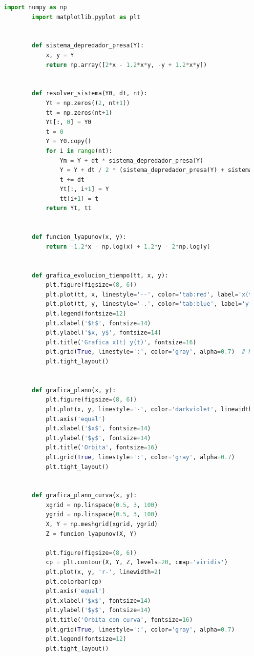 \documentclass{report}
\begin{document}
    \begin{lstlisting}[language=Python]
        import numpy as np
        import matplotlib.pyplot as plt
        
        
        def sistema_depredador_presa(Y):
            x, y = Y
            return np.array([2*x - 1.2*x*y, -y + 1.2*x*y])
        
        
        def resolver_sistema(Y0, dt, nt):
            Yt = np.zeros((2, nt+1))
            tt = np.zeros(nt+1)
            Yt[:, 0] = Y0
            t = 0
            Y = Y0.copy()
            for i in range(nt):
                Ym = Y + dt * sistema_depredador_presa(Y)
                Y = Y + dt / 2 * (sistema_depredador_presa(Y) + sistema_depredador_presa(Ym))
                t += dt
                Yt[:, i+1] = Y
                tt[i+1] = t
            return Yt, tt
        
        
        def funcion_lyapunov(x, y):
            return -1.2*x - np.log(x) + 1.2*y - 2*np.log(y)
        
        
        def grafica_evolucion_tiempo(tt, x, y):
            plt.figure(figsize=(8, 6))
            plt.plot(tt, x, linestyle='--', color='tab:red', label='x(t)', linewidth=2)
            plt.plot(tt, y, linestyle='-.', color='tab:blue', label='y(t)', linewidth=2)
            plt.legend(fontsize=12)
            plt.xlabel('$t$', fontsize=14)
            plt.ylabel('$x, y$', fontsize=14)
            plt.title('Grafica x(t) y(t)', fontsize=16)
            plt.grid(True, linestyle=':', color='gray', alpha=0.7)  # More subtle grid lines
            plt.tight_layout()
        
        
        def grafica_plano(x, y):
            plt.figure(figsize=(8, 6))
            plt.plot(x, y, linestyle='-', color='darkviolet', linewidth=2)
            plt.axis('equal')
            plt.xlabel('$x$', fontsize=14)
            plt.ylabel('$y$', fontsize=14)
            plt.title('Orbita', fontsize=16)
            plt.grid(True, linestyle=':', color='gray', alpha=0.7)
            plt.tight_layout()
        
        
        def grafica_plano_curva(x, y):
            xgrid = np.linspace(0.5, 3, 100)
            ygrid = np.linspace(0.5, 3, 100)
            X, Y = np.meshgrid(xgrid, ygrid)
            Z = funcion_lyapunov(X, Y)
        
            plt.figure(figsize=(8, 6))
            cp = plt.contour(X, Y, Z, levels=20, cmap='viridis')
            plt.plot(x, y, 'r-', linewidth=2)
            plt.colorbar(cp)
            plt.axis('equal')
            plt.xlabel('$x$', fontsize=14)
            plt.ylabel('$y$', fontsize=14)
            plt.title('Orbita con curva', fontsize=16)
            plt.grid(True, linestyle=':', color='gray', alpha=0.7)
            plt.legend(fontsize=12)
            plt.tight_layout()
        

\end{lstlisting}
\end{document}
